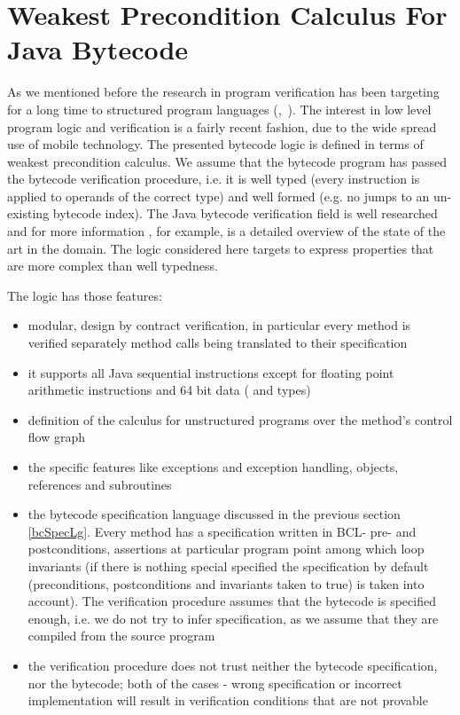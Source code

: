 
\section{Weakest Precondition Calculus For Java Bytecode}\label{verifCond}
As we mentioned before the research in program verification has been targeting for a long time to structured program languages (\cite{WPCDS},~\cite{DisDij}). 
The interest in low level program logic and verification is a fairly recent fashion, due to the wide spread use of mobile technology.
The presented bytecode logic is defined in terms of weakest precondition calculus. We assume 
that the bytecode program has passed the bytecode verification procedure, i.e. it is well typed 
(every instruction is applied to operands of the correct type) and well formed 
(e.g. no jumps to an un-existing bytecode index). The Java bytecode verification field is  well researched and 
for more information \cite{Ljbc}, for example, is a detailed overview of the state of the art in the domain. 
The logic considered here targets to express properties that are more complex than well typedness.

The logic has those features:
\begin{itemize}
\item modular, design by contract verification, in particular every method is verified separately method calls being translated to their specification 
\item it supports all Java sequential instructions except for floating point arithmetic instructions and 64 bit data ( and  types)
\item definition of the calculus for unstructured programs over the method's control flow graph
\item the specific features like exceptions and exception handling, objects, references and subroutines
\item the bytecode specification language discussed in the previous section \ref{bcSpecLg}. Every method has a specification written 
in BCL- pre- and postconditions, assertions at particular program point among 
which loop invariants (if there is nothing special specified the specification by default (preconditions, postconditions and invariants taken to true) is taken into account). The verification procedure assumes that the bytecode is specified enough, i.e. we do not try to infer specification, as we assume that they are compiled from the source program
\item the verification procedure does not trust neither the bytecode specification, nor the bytecode; both of the cases - wrong 
specification or incorrect implementation will result in verification conditions that are not provable 
\end{itemize}

